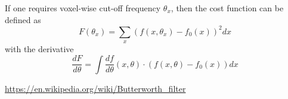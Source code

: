 \documentclass{article}
\begin{document}
\noindent If one requires voxel-wise cut-off frequency $\theta_x$, then the cost function can be defined as
\begin{equation}\label{eq12}
F(\theta_x) = \sum_x (f(x,\theta_x) - f_0(x))^2dx
\end{equation}
with the derivative
\begin{equation}\label{eq13}
\frac{dF}{d\theta} = \int \frac{df}{d\theta}(x,\theta) \cdot (f(x,\theta) - f_0(x))dx
\end{equation}
\begin{thebibliography}{9}
 \url{https://en.wikipedia.org/wiki/Butterworth_filter}
\end{thebibliography}
\end{document}
